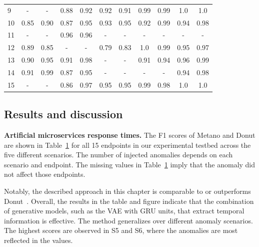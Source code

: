 \begin{table}[htbp]
{\begin{tabular}{l|cc|cc|cc|cc|cc}
9                                                             & -          & -          & 0.88       & 0.92       & 0.92       & 0.91       & 0.99       & 0.99       & 1.0        & 1.0        \\
10                                                            & 0.85       & 0.90       & 0.87       & 0.95       & 0.93       & 0.95       & 0.92       & 0.99       & 0.94       & 0.98       \\
11                                                            & -          & -          & 0.96       & 0.96       & -          & -          & -          & -          & -          & -          \\
12                                                            & 0.89       & 0.85       & -          & -          & 0.79       & 0.83       & 1.0        & 0.99       & 0.95       & 0.97       \\
13                                                            & 0.90       & 0.95       & 0.91       & 0.98       & -          & -          & 0.91       & 0.94       & 0.96       & 0.99       \\
14                                                            & 0.91       & 0.99       & 0.87       & 0.95       & -          & -          & -          & -          & 0.94       & 0.98       \\
15                                                            & -          & -          & 0.86       & 0.97       & 0.95       & 0.95       & 0.99       & 0.98       & 1.0        & 1.0        \\ \hline
\end{tabular}\label{table_res_vae}
}
\end{table}
\subsection{Results and discussion}




\noindent\textbf{Artificial microservices response times.}
The F1 scores of Metano and Donut are shown in Table~\ref{table_res_vae} for all 15 endpoints in our experimental testbed across the five different scenarios. The number of injected anomalies depends on each scenario and endpoint. The missing values in Table~\ref{table_res_vae} imply that the anomaly did not affect those endpoints. 

Notably, the described approach in this chapter is comparable to or outperforms Donut~\cite{donut}. Overall, the results in the table and figure indicate that the combination of generative models, such as the VAE with GRU units, that extract temporal information is effective. The method generalizes over different anomaly scenarios. The highest scores are observed in S5 and S6, where the anomalies are most reflected in the values.

